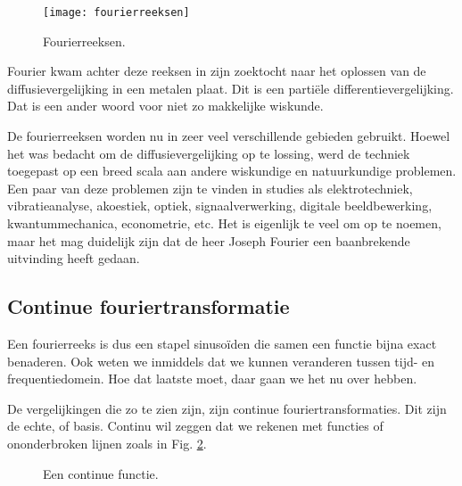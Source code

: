 \documentclass[11pt,fleqn]{book} %
\begin{document}
\begin{figure}[h]
	\centering\texttt{[image: fourierreeksen]}
	\caption{Fourierreeksen.}
	\label{fig:fourierreeksen}
\end{figure}

Fourier kwam achter deze reeksen in zijn zoektocht naar het oplossen van de diffusievergelijking in een metalen plaat. Dit is een partiële differentievergelijking. Dat is een ander woord voor niet zo makkelijke wiskunde.

De fourierreeksen worden nu in zeer veel verschillende gebieden gebruikt. Hoewel het was bedacht om de diffusievergelijking op te lossing, werd de techniek toegepast op een breed scala aan andere wiskundige en natuurkundige problemen. Een paar van deze problemen zijn te vinden in studies als elektrotechniek, vibratieanalyse, akoestiek, optiek, signaalverwerking, digitale beeldbewerking, kwantummechanica, econometrie, etc. Het is eigenlijk te veel om op te noemen, maar het mag duidelijk zijn dat de heer Joseph Fourier een baanbrekende uitvinding heeft gedaan.

\subsection{Continue fouriertransformatie}
Een fourierreeks is dus een stapel sinusoïden die samen een functie bijna exact benaderen. Ook weten we inmiddels dat we kunnen veranderen tussen tijd- en frequentiedomein. Hoe dat laatste moet, daar gaan we het nu over hebben.

De vergelijkingen die zo te zien zijn, zijn continue fouriertransformaties. Dit zijn de echte, of basis. Continu wil zeggen dat we rekenen met functies of ononderbroken lijnen zoals in Fig. \ref{fig:fx}.

\begin{figure}
\centering
{}
\caption{Een continue functie.}
\label{fig:fx}
\end{figure}
\end{document}
